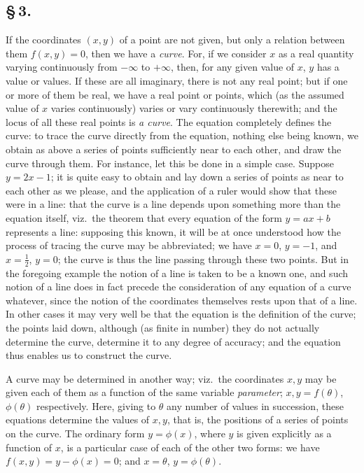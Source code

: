\documentclass[11pt,a4paper]{article}
\begin{document}
\subsection*{\S\,3.}

If the coordinates $(x, y)$ of a point are not given, but only a relation between them $f(x, y) = 0$, then we have a \textit{curve}. For, if we consider $x$ as a real quantity varying continuously from $-\infty$ to $+\infty$, then, for any given value of $x$, $y$ has a value or values. If these are all imaginary, there is not any real point; but if one or more of them be real, we have a real point or points, which (as the assumed value of $x$ varies continuously) varies or vary continuously therewith; and the locus of all these real points is \textit{a curve}. The equation completely defines the curve: to trace the curve directly from the equation, nothing else being known, we obtain as above a series of points sufficiently near to each other, and draw the curve through them. For instance, let this be done in a simple case. Suppose $y = 2x - 1$; it is quite easy to obtain and lay down a series of points as near to each other as we please, and the application of a ruler would show that these were in a line: that the curve is a line depends upon something more than the equation itself, viz.\ the theorem that every equation of the form $y = ax + b$ represents a line: supposing this known, it will be at once understood how the process of tracing the curve may be abbreviated; we have $x = 0$, $y = -1$, and $x = \frac{1}{2}$, $y = 0$; the curve is thus the line passing through these two points. But in the foregoing example the notion of a line is taken to be a known one, and such notion of a line does in fact precede the consideration of any equation of a curve whatever, since the notion of the coordinates themselves rests upon that of a line. In other cases it may very well be that the equation is the definition of the curve; the points laid down, although (as finite in number) they do not actually determine the curve, determine it to any degree of accuracy; and the equation thus enables us to construct the curve.

A curve may be determined in another way; viz.\ the coordinates $x, y$ may be given each of them as a function of the same variable \textit{parameter}; $x, y = f(\theta)$, $\phi(\theta)$ respectively. Here, giving to $\theta$ any number of values in succession, these equations determine the values of $x, y$, that is, the positions of a series of points on the curve. The ordinary form $y = \phi(x)$, where $y$ is given explicitly as a function of $x$, is a particular case of each of the other two forms: we have $f(x, y) = y - \phi(x) = 0$; and $x = \theta$, $y = \phi(\theta)$.
\end{document}
